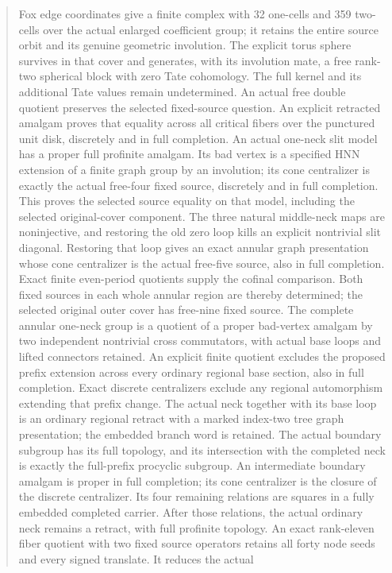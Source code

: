 \documentclass[11pt,a4paper]{article}
\begin{document}
\begin{abstract}
Fox edge coordinates give a finite complex with 32 one-cells and 359
two-cells over the actual enlarged coefficient group; it retains the
entire source orbit and its genuine geometric involution. The explicit
torus sphere survives in that cover and generates, with its involution
mate, a free rank-two spherical block with zero Tate cohomology. The
full kernel and its additional Tate values remain undetermined. An actual
free double quotient preserves the selected fixed-source question.
An explicit retracted amalgam proves that equality across all critical
fibers over the punctured unit disk, discretely and in full completion.
An actual one-neck slit model has a proper full profinite amalgam.
Its bad vertex is a specified HNN extension of a finite graph group by
an involution; its cone centralizer is exactly the actual free-four
fixed source, discretely and in full completion. This proves the selected
source equality on that model, including the selected original-cover
component. The three natural middle-neck maps are noninjective, and
restoring the old zero loop kills an explicit nontrivial slit diagonal.
Restoring that loop gives an exact annular graph presentation whose
cone centralizer is the actual free-five source, also in full completion.
Exact finite even-period quotients supply the cofinal comparison. Both
fixed sources in each whole annular region are thereby determined; the
selected original outer cover has free-nine fixed source. The complete
annular one-neck group is a quotient of a proper bad-vertex amalgam by
two independent nontrivial cross commutators, with actual base loops
and lifted connectors retained. An explicit finite quotient excludes the proposed prefix extension
across every ordinary regional base section, also in full completion.
Exact discrete centralizers exclude any regional automorphism extending
that prefix change. The actual neck together with its base loop is an
ordinary regional retract with a marked index-two tree graph presentation;
the embedded branch word is retained. The actual boundary subgroup
has its full topology, and its intersection with the completed neck is
exactly the full-prefix procyclic subgroup. An intermediate boundary
amalgam is proper in full completion; its cone centralizer is the closure
of the discrete centralizer. Its four remaining relations are squares
in a fully embedded completed carrier. After those relations, the actual
ordinary neck remains a retract, with full profinite topology. An exact
rank-eleven fiber quotient with two fixed source operators retains all
forty node seeds and every signed translate. It reduces the actual

\end{abstract}
\end{document}
